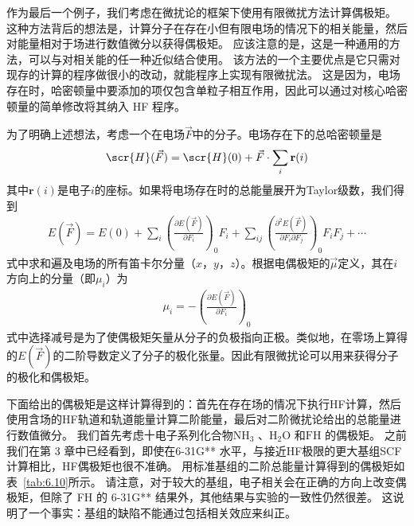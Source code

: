 作为最后一个例子，我们考虑在微扰论的框架下使用有限微扰方法计算偶极矩。 这种方法背后的想法是，计算分子在存在小但有限电场的情况下的相关能量，然后对能量相对于场进行数值微分以获得偶极矩。 应该注意的是，这是一种通用的方法，可以与对相关能的任一种近似结合使用。 该方法的一个主要优点是它只需对现存的计算的程序做很小的改动，就能程序上实现有限微扰法。 这是因为，电场存在时，哈密顿量中要添加的项仅包含单粒子相互作用，因此可以通过对核心哈密顿量的简单修改将其纳入 HF 程序。

为了明确上述想法，考虑一个在电场$\vec{F}$中的分子。电场存在下的总哈密顿量是
\begin{align}
	\scr{H}(\vec{F}) = \scr{H}(0) + \vec{F}\cdot \sum_i \mathbf{r}(i)
\end{align}
其中$\mathbf{r}(i)$是电子$i$的座标。如果将电场存在时的总能量展开为Taylor级数，我们得到
\begin{align}
	E(\vec{F}) = E(0) + \sum_i \left(\frac{\partial E(\vec{F})}{\partial F_i} \right)_0 F_i + \sum_{ij} \left(\frac{\partial^2 E(\vec{F})}{\partial F_i\partial F_j} \right)_0 F_iF_j + \cdots
\end{align}
式中求和遍及电场的所有笛卡尔分量（$x$，$y$，$z$）。根据电偶极矩的$\vec{\mu}$定义，其在$i$方向上的分量（即$\mu_i$）为
\begin{align}
	\mu_i = -\left(\frac{\partial E(\vec{F})}{\partial F_i}\right)_0
\end{align}
式中选择减号是为了使偶极矩矢量从分子的负极指向正极。类似地，在零场上算得的$E(\vec{F})$的二阶导数定义了分子的极化张量。因此有限微扰论可以用来获得分子的极化和偶极矩。

下面给出的偶极矩是这样计算得到的：首先在存在场的情况下执行HF计算，然后使用含场的HF轨道和轨道能量计算二阶能量，最后对二阶微扰论给出的总能量进行数值微分。 我们首先考虑十电子系列化合物$\mathrm{NH_3}$ 、$\mathrm{H_2O}$ 和$\mathrm{FH}$ 的偶极矩。 之前我们在第 3 章中已经看到，即使在6-31G** 水平，与接近HF极限的更大基组SCF计算相比，HF偶极矩也很不准确。 用标准基组的二阶总能量计算得到的偶极矩如表~\autoref{tab:6.10}所示。 请注意，对于较大的基组，电子相关会在正确的方向上改变偶极矩，但除了 FH 的 6-31G** 结果外，其他结果与实验的一致性仍然很差。 这说明了一个事实：基组的缺陷不能通过包括相关效应来纠正。

